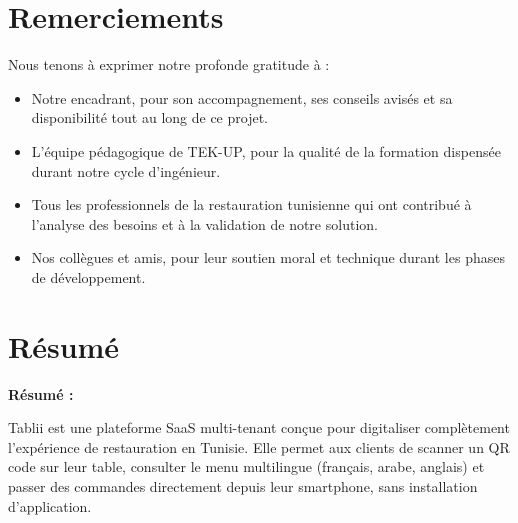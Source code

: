 \documentclass[12pt,a4paper]{report}
\begin{document}
\cleardoublepage
\chapter*{Remerciements}

Nous tenons \`a exprimer notre profonde gratitude \`a :

\begin{itemize}[leftmargin=2cm, itemsep=0.5cm]
    \item Notre encadrant, pour son accompagnement, ses conseils avis\'es et sa disponibilit\'e tout au long de ce projet.
    \item L'\'equipe p\'edagogique de TEK-UP, pour la qualit\'e de la formation dispens\'ee durant notre cycle d'ing\'enieur.
    \item Tous les professionnels de la restauration tunisienne qui ont contribu\'e \`a l'analyse des besoins et \`a la validation de notre solution.
    \item Nos coll\`egues et amis, pour leur soutien moral et technique durant les phases de d\'eveloppement.
\end{itemize}

\cleardoublepage
\chapter*{R\'esum\'e}

\begin{center}
\end{center}

\vspace{0.5cm}

\textbf{R\'esum\'e :}

Tablii est une plateforme SaaS multi-tenant con\c{c}ue pour digitaliser compl\`etement 
l'exp\'erience de restauration en Tunisie. Elle permet aux clients de scanner un QR code sur leur table, 
consulter le menu multilingue (fran\c{c}ais, arabe, anglais) et passer des commandes directement 
depuis leur smartphone, sans installation d'application.
\end{document}

